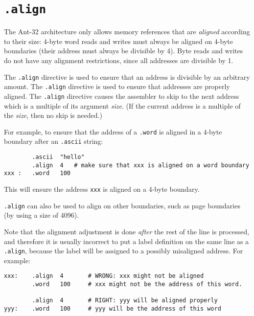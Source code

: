 \section{{\tt .align}}

The Ant-32 architecture only allows memory references that are {\em
aligned} according to their size:  4-byte word reads and writes must
always be aligned on 4-byte boundaries (their address must always be
divisible by 4).  Byte reads and writes do not have any alignment
restrictions, since all addresses are divisible by 1.

The {\tt .align} directive is used to ensure that an address is
divisible by an arbitrary amount.  The {\tt .align} directive is used
to ensure that addresses are properly aligned.  The {\tt .align}
directive causes the assembler to skip to the next address which is a
multiple of its argument {\em size}.  (If the current address is a
multiple of the {\em size}, then no skip is needed.)

For example, to ensure that the address of a {\tt .word}
is aligned in a 4-byte boundary after an {\tt .ascii} string:

\begin{verbatim}
        .ascii  "hello"
        .align  4	# make sure that xxx is aligned on a word boundary
xxx :   .word   100
\end{verbatim}

This will ensure the address {\tt xxx} is aligned on a 4-byte boundary.

{\tt .align} can also be used to align on other boundaries, such as
page boundaries (by using a size of 4096).

Note that the alignment adjustment is done {\em after} the rest of the
line is processed, and therefore it is usually incorrect to
put a label definition on the same line as a {\tt .align}, because
the label will be assigned to a possibly misaligned address.  For example:

\begin{verbatim}
xxx:    .align  4       # WRONG: xxx might not be aligned
        .word   100     # xxx might not be the address of this word.

        .align  4       # RIGHT: yyy will be aligned properly
yyy:    .word   100     # yyy will be the address of this word
\end{verbatim}

